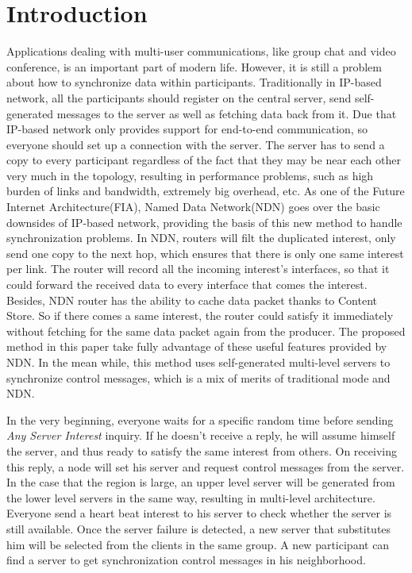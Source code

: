 \documentclass[conference]{IEEEtran}
\begin{document}
\section{Introduction}
Applications dealing with multi-user communications, like group chat and video conference, is an important part of modern life. However, it is still a problem about how to synchronize data within participants. Traditionally in IP-based network, all the participants should register on the central server, send self-generated messages to the server as well as fetching data back from it. Due that IP-based network only provides support for end-to-end communication, so everyone should set up a connection with the server. The server has to send a copy to every participant regardless of the fact that they may be near each other very much in the topology, resulting in performance problems, such as high burden of links and bandwidth, extremely big overhead, etc. As one of the Future Internet Architecture(FIA)\cite{FIA}, Named Data Network(NDN)\cite{NDN001} goes over the basic downsides of IP-based network, providing the basis of this new method to handle synchronization problems. In NDN, routers will filt the duplicated interest, only send one copy to the next hop, which ensures that there is only one same interest per link. The router will record all the incoming interest's interfaces, so that it could forward the received data to every interface that comes the interest. Besides, NDN router has the ability to cache data packet thanks to Content Store. So if there comes a same interest, the router could satisfy it immediately without fetching for the same data packet again from the producer. The proposed method in this paper take fully advantage of these useful features provided by NDN. In the mean while, this method uses self-generated multi-level servers to synchronize control messages, which is a mix of merits of traditional mode and NDN.

In the very beginning, everyone waits for a specific random time before sending \emph{Any Server Interest} inquiry. If he doesn't receive a reply, he will assume himself the server, and thus ready to satisfy the same interest from others. On receiving this reply, a node will set his server and request control messages from the server. In the case that the region is large, an upper level server will be generated from the lower level servers in the same way, resulting in multi-level architecture. Everyone send a heart beat interest to his server to check whether the server is still available. Once the server failure is detected, a new server that substitutes him will be selected from the clients in the same group. A new participant can find a server to get synchronization control messages in his neighborhood.
\end{document}
